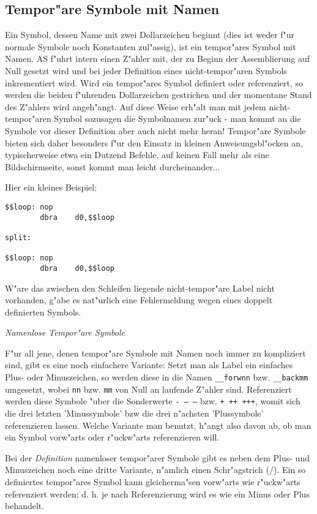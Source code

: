 \documentclass[12pt,a4paper,twoside]{report}
\begin{document}
\subsection{Tempor"are Symbole mit Namen}

Ein Symbol, dessen Name mit zwei Dollarzeichen beginnt (dies ist weder
f"ur normale Symbole noch Konstanten zul"assig), ist ein tempor"ares
Symbol mit Namen.  AS f"uhrt intern einen Z"ahler mit, der zu Beginn der
Assemblierung auf Null gesetzt wird und bei jeder Definition eines
nicht-tempor"aren Symbols inkrementiert wird.  Wird ein tempor"ares Symbol
definiert oder referenziert, so werden die beiden f"uhrenden Dollarzeichen
gestrichen und der momentane Stand des Z"ahlers wird angeh"angt.  Auf
diese Weise erh"alt man mit jedem nicht-tempor"aren Symbol sozusagen die
Symbolnamen zur"uck - man kommt an die Symbole vor dieser Definition aber
auch nicht mehr heran!  Tempor"are Symbole bieten sich daher besonders
f"ur den Einsatz in kleinen Anweisungsbl"ocken an, typischerweise etwa ein
Dutzend Befehle, auf keinen Fall mehr als eine Bildschirmseite, sonst
kommt man leicht durcheinander...

Hier ein kleines Beispiel: 
\begin{verbatim}
$$loop: nop
        dbra    d0,$$loop

split:

$$loop: nop
        dbra    d0,$$loop
\end{verbatim}
W"are das zwischen den Schleifen liegende nicht-tempor"are Label nicht
vorhanden, g"abe es nat"urlich eine Fehlermeldung wegen eines doppelt
definierten Symbols.

{\em Namenlose Tempor"are Symbole}

F"ur all jene, denen tempor"are Symbole mit Namen noch immer zu
kompliziert sind, gibt es eine noch einfachere Variante: Setzt man als
Label ein einfaches Plus- oder Minuszeichen, so werden diese in die Namen
{\tt \_\_forwnn} bzw. {\tt \_\_backmm} umgesetzt, wobei {\tt nn} bzw. {\tt mm}
von Null an laufende Z"ahler sind.  Referenziert werden diese Symbole
"uber die Sonderwerte {\tt - -- ---} bzw. {\tt + ++ +++}, womit sich die
drei letzten 'Minussymbole' bzw die drei n"achsten 'Plussymbole'
referenzieren lassen.  Welche Variante man benutzt, h"angt also davon ab,
ob man ein Symbol vorw"arts oder r"uckw"arts referenzieren will.  

Bei der {\em Definition} namenloser tempor"arer Symbole gibt es neben dem
Plus- und Minuszeichen noch eine dritte Variante, n"amlich einen
Schr"agstrich (/).  Ein so definiertes tempor"ares Symbol kann
gleicherma"sen vorw"arts wie r"uckw"arts referenziert werden; d. h. je
nach Referenzierung wird es wie ein Minus oder Plus behandelt.
\end{document}
